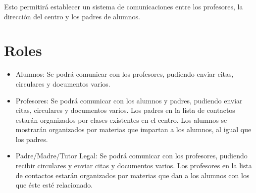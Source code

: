 Esto permitirá establecer un sistema de comunicaciones entre los profesores, la dirección del centro y los padres de alumnos.

\section{Roles}

	\begin{itemize}
		\item Alumnos: Se podrá comunicar con los profesores, pudiendo enviar citas, circulares y documentos varios.
		\item Profesores: Se podrá comunicar con los alumnos y padres, pudiendo enviar citas, circulares y documentos varios. Los padres en la lista de contactos estarán organizados por clases existentes en el centro. Los alumnos se mostrarán organizados por materias que impartan a los alumnos, al igual que los padres.
		\item Padre/Madre/Tutor Legal: Se podrá comunicar con los profesores, pudiendo recibir circulares y enviar citas y documentos varios. Los profesores en la lista de contactos estarán organizados por materias que dan a los alumnos con los que éste esté relacionado.
	\end{itemize}
